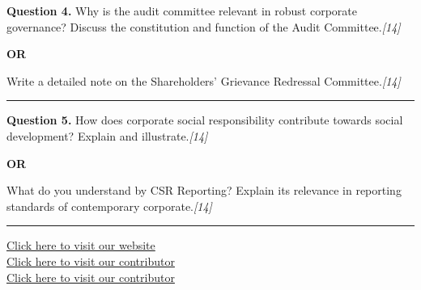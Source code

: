 \documentclass[11pt,a4paper]{article}
\newcommand{\pts}[1]{\hfill   \textit{[#1]}}
\begin{document}
\noindent   \textbf{Question 4.}
Why is the audit committee relevant in robust corporate governance? Discuss the constitution and function of the Audit Committee.\pts{14}

\centerline{   \textbf{OR}}

Write a detailed note on the Shareholders' Grievance Redressal Committee.\pts{14}

\medskip\rule{\linewidth}{0.2pt}




\noindent   \textbf{Question 5.}
How does corporate social responsibility contribute towards social development? Explain and illustrate.\pts{14}

\centerline{   \textbf{OR}}

What do you understand by CSR Reporting? Explain its relevance in reporting standards of contemporary corporate.\pts{14}

\vfill
\rule{\linewidth}{0.4pt}

\begin{center}\small
\href{https://bhu-exam.vercel.app/}{Click here to visit our website}\\[4pt]
\href{https://me-aryan.vercel.app/}{Click here to visit our contributor}\\[4pt]
\href{https://quashan-me.vercel.app/}{Click here to visit our contributor}
\end{center}
\end{document}
